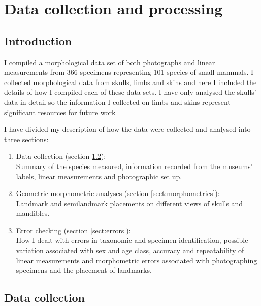 
\chapter{Data collection and processing}
\label{chap:methods}

\section{Introduction}

	I compiled a morphological data set of both photographs and linear measurements from 366 specimens representing 101 species of small mammals. %
	I collected morphological data from skulls, limbs and skins and here I included the details of how I compiled each of these data sets. I have only analysed the skulls' data in detail so the information I collected on limbs and skins represent significant resources for future work %
	
	I have divided my description of how the data were collected and analysed into three sections:
	
	\begin{enumerate}[i]
	
	\item Data collection (section \ref{sect:datacollection}): \\
	Summary of the species measured, information recorded from the museums' labels, linear measurements and photographic set up.
	
	\item Geometric morphometric analyses (section \ref{sect:morphometrics}):\\
	Landmark and semilandmark placements on different views of skulls and mandibles.
	
	\item Error checking (section \ref{sect:errors}): \\
	How I dealt with errors in taxonomic and specimen identification, possible variation associated with sex and age class, accuracy and repeatability of linear measurements and morphometric errors associated with photographing specimens and the placement of landmarks.
	

	
	\end{enumerate} 


\section{Data collection}
\label{sect:datacollection}


